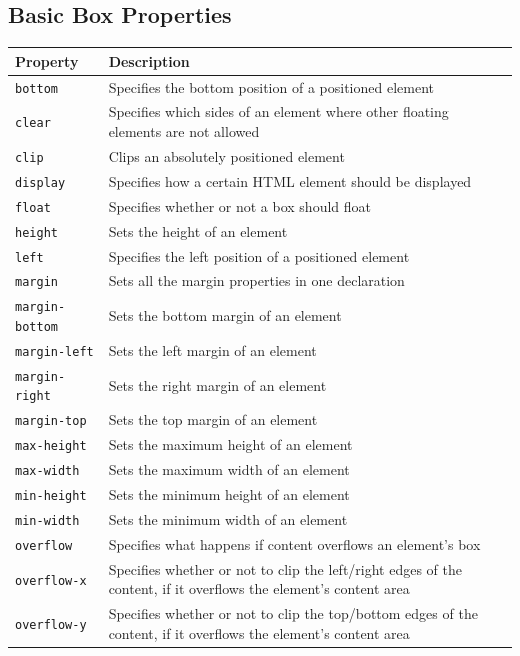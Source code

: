 \documentclass[11pt, letterpaper]{article}
\begin{document}
		\subsection{Basic Box Properties}
			\begin{longtable}{p{5cm} p{10cm}}
				\toprule
				Property & Description \\\midrule 
				\texttt{bottom} & Specifies the bottom position of a positioned element \\\midrule
				\texttt{clear} & Specifies which sides of an element where other floating elements are not allowed \\\midrule
				\texttt{clip} & Clips an absolutely positioned element \\\midrule
				\texttt{display} & Specifies how a certain HTML element should be displayed \\\midrule
				\texttt{float} & Specifies whether or not a box should float \\\midrule
				\texttt{height} & Sets the height of an element \\\midrule
				\texttt{left} & Specifies the left position of a positioned element \\\midrule
				\texttt{margin} & Sets all the margin properties in one declaration \\\midrule
				\texttt{margin-bottom} & Sets the bottom margin of an element \\\midrule
				\texttt{margin-left} & Sets the left margin of an element \\\midrule
				\texttt{margin-right} & Sets the right margin of an element \\\midrule
				\texttt{margin-top} & Sets the top margin of an element \\\midrule
				\texttt{max-height} & Sets the maximum height of an element \\\midrule
				\texttt{max-width} & Sets the maximum width of an element \\\midrule
				\texttt{min-height} & Sets the minimum height of an element \\\midrule
				\texttt{min-width} & Sets the minimum width of an element \\\midrule
				\texttt{overflow} & Specifies what happens if content overflows an element's box \\\midrule
				\texttt{overflow-x} & Specifies whether or not to clip the left/right edges of the content, if it overflows the element's content area \\\midrule
				\texttt{overflow-y} & Specifies whether or not to clip the top/bottom edges of the content, if it overflows the element's content area \\\midrule

\end{longtable}
\end{document}
